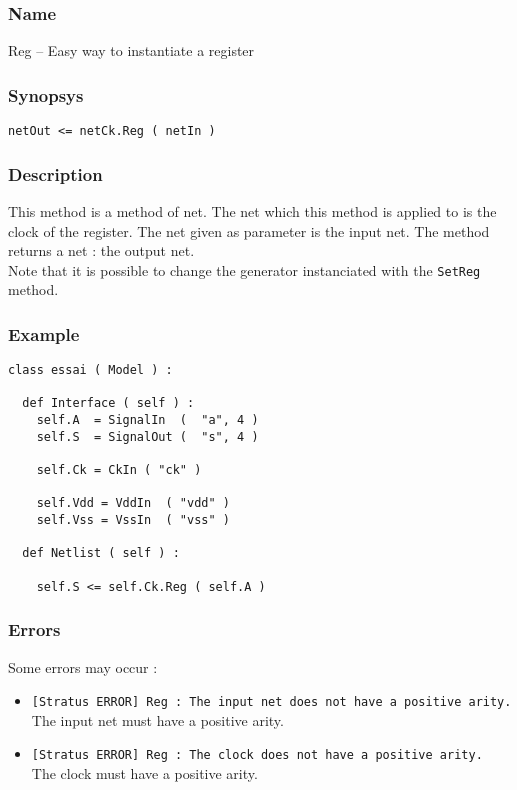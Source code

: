 \subsubsection{Name}

Reg -- Easy way to instantiate a register

\subsubsection{Synopsys}

\begin{verbatim}
netOut <= netCk.Reg ( netIn )
\end{verbatim}
  
\subsubsection{Description}

This method is a method of net. The net which this method is applied to is the clock of the register. The net given as parameter is the input net. The method returns a net : the output net.\\
\indent Note that it is possible to change the generator instanciated with the \verb-SetReg- method.

\subsubsection{Example}

\begin{verbatim}
class essai ( Model ) :

  def Interface ( self ) :
    self.A  = SignalIn  (  "a", 4 )
    self.S  = SignalOut (  "s", 4 )

    self.Ck = CkIn ( "ck" )
    
    self.Vdd = VddIn  ( "vdd" )
    self.Vss = VssIn  ( "vss" )
	
  def Netlist ( self ) :

    self.S <= self.Ck.Reg ( self.A ) 
\end{verbatim}
    
\subsubsection{Errors}
    
Some errors may occur :
\begin{itemize}
    \item \verb-[Stratus ERROR] Reg : The input net does not have a positive arity.-\\The input net must have a positive arity.
    \item \verb-[Stratus ERROR] Reg : The clock does not have a positive arity.-\\The clock must have a positive arity.
\end{itemize}

